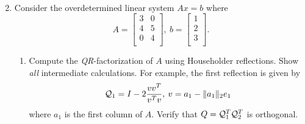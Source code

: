 \documentclass{article}
\newcommand{\twonorm}[1]{\| #1 \|_2}
\begin{document}
\begin{enumerate}
{\begin{align*}
  \end{align*}
  }
  \newpage
  \item Consider the overdetermined linear system $Ax = b$ where
  \[ A = 
  \begin{bmatrix}
    3 & 0 \\
    4 & 5 \\
    0 & 4 \\
  \end{bmatrix}
  ,\: b = 
  \begin{bmatrix}
    1 \\
    2 \\
    3 \\
  \end{bmatrix}.
  \]
  \begin{enumerate}
      \item Compute the \textit{QR}-factorization of $A$ using Householder reflections. Show \textit{all} intermediate calculations. For example, the first reflection is given by 
      \[
        \calQ_1 = I - 2 \frac{vv^T}{v^Tv} , \: v = a_1 - \twonorm{a_1}e_1
      \]
      where $a_1$ is the first column of $A$. Verify that $Q = \mathcal{Q}_1^T\mathcal{Q}_2^T$ is orthogonal.
      

\end{enumerate}
\end{enumerate}
\end{document}
